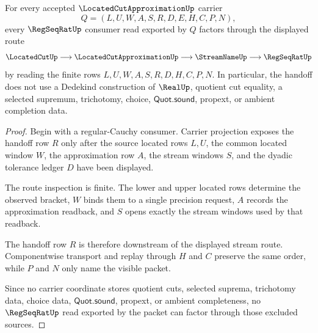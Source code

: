 \begin{theorem}
\label{thm:located-cut-approximation-regular-cauchy-handoff}
For every accepted $\LocatedCutApproximationUp$ carrier
$$
Q=(L,U,W,A,S,R,D,E,H,C,P,N),
$$
every $\RegSeqRatUp$ consumer read exported by $Q$ factors through the displayed route
$$
\LocatedCutUp \longrightarrow \LocatedCutApproximationUp \longrightarrow \StreamNameUp \longrightarrow \RegSeqRatUp
$$
by reading the finite rows $L,U,W,A,S,R,D,H,C,P,N$. In particular, the handoff does not use a Dedekind construction of $\RealUp$, quotient cut equality, a selected supremum, trichotomy, choice, $\mathsf{Quot.sound}$, propext, or ambient completion data.
\end{theorem}
\begin{proof}
Begin with a regular-Cauchy consumer. Carrier projection exposes the handoff row $R$ only after the source located rows $L,U$, the common located window $W$, the approximation row $A$, the stream windows $S$, and the dyadic tolerance ledger $D$ have been displayed.

The route inspection is finite. The lower and upper located rows determine the observed bracket, $W$ binds them to a single precision request, $A$ records the approximation readback, and $S$ opens exactly the stream windows used by that readback.

The handoff row $R$ is therefore downstream of the displayed stream route. Componentwise transport and replay through $H$ and $C$ preserve the same order, while $P$ and $N$ only name the visible packet.

Since no carrier coordinate stores quotient cuts, selected suprema, trichotomy data, choice data, $\mathsf{Quot.sound}$, propext, or ambient completeness, no $\RegSeqRatUp$ read exported by the packet can factor through those excluded sources.
\end{proof}

